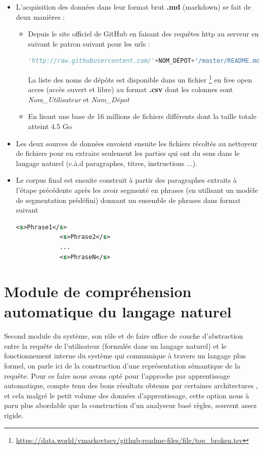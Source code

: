 		\begin{itemize}
			\item L'acquisition des données dans leur format brut \textbf{.md} (markdown) se fait de deux manières :
			\begin{itemize}
				\item Depuis le site officiel de GitHub en faisant des requêtes http au serveur en suivant le patron suivant pour les urls : 
				\begin{lstlisting}[language=python]
				'http://raw.githubusercontent.com/'+NOM_DÉPOT+'/master/README.md'\end{lstlisting}
				La liste des noms de dépôts est disponible dans un fichier \footnote{\url{https://data.world/vmarkovtsev/github-readme-files/file/top_broken.tsv}} en free open acces (accès ouvert et libre) au format \textbf{.csv} dont les colonnes sont \textit{Nom\_Utilisateur} et \textit{Nom\_Dépot} 
				\item En lisant une base de 16 millions de fichiers différents dont la taille totale atteint 4.5 Go  
			\end{itemize}
			\item Les deux sources de données envoient ensuite les fichiers récoltés au nettoyeur de fichiers pour en extraire seulement les parties qui ont du sens dans le langage naturel (c.à.d paragraphes, titres, instructions ...).
			\item Le corpus final est ensuite construit à partir des paragraphes extraits à l'étape précédente après les avoir segmenté en phrases (en utilisant un modèle de segmentation prédéfini) donnant un ensemble de phrases dans format suivant \begin{lstlisting}[language=xml]
			<s>Phrase1</s>
			<s>Phrase2</s>
			...
			<s>PhraseN</s>\end{lstlisting}
		\end{itemize}
		

\section{Module de compréhension automatique du langage naturel}
\paragraph{}
Second module du système, son rôle et de faire office de couche d'abstraction entre la requête de l'utilisateur (formulée dans un langage naturel) et le fonctionnement interne du système qui communique à travers un langage plus formel, on parle ici de la construction d'une représentation sémantique de la requête. Pour ce faire nous avons opté pour l'approche par apprentissage automatique, compte tenu des bons résultats obtenus par certaines architectures \cite{intent_slots},\cite{intent_classification} et cela malgré le petit volume des données d'apprentissage, cette option nous à paru plus abordable que la construction d'un analyseur basé règles, souvent assez rigide.
